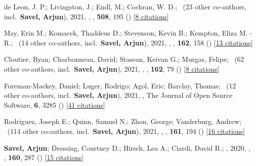 \item[{\color{numcolor}\scriptsize7}] de Leon, J. P.; Livingston, J.; Endl, M.; Cochran, W. D.; \etal\ ({23} other co-authors, incl.\ \textbf{Savel, Arjun}), 2021, , \mnras, \textbf{508}, 195 () [\href{https://ui.adsabs.harvard.edu/abs/2021MNRAS.508..195D}{8 citations}]

\item[{\color{numcolor}\scriptsize6}] May, Erin M.; Komacek, Thaddeus D.; Stevenson, Kevin B.; Kempton, Eliza M. -R.; \etal\ ({14} other co-authors, incl.\ \textbf{Savel, Arjun}), 2021, , \aj, \textbf{162}, 158 () [\href{https://ui.adsabs.harvard.edu/abs/2021AJ....162..158M}{13 citations}]

\item[{\color{numcolor}\scriptsize5}] Cloutier, Ryan; Charbonneau, David; Stassun, Keivan G.; Murgas, Felipe; \etal\ ({62} other co-authors, incl.\ \textbf{Savel, Arjun}), 2021, , \aj, \textbf{162}, 79 () [\href{https://ui.adsabs.harvard.edu/abs/2021AJ....162...79C}{8 citations}]

\item[{\color{numcolor}\scriptsize4}] Foreman-Mackey, Daniel; Luger, Rodrigo; Agol, Eric; Barclay, Thomas; \etal\ ({12} other co-authors, incl.\ \textbf{Savel, Arjun}), 2021, , The Journal of Open Source Software, \textbf{6}, 3285 () [\href{https://ui.adsabs.harvard.edu/abs/2021JOSS....6.3285F}{41 citations}]

\item[{\color{numcolor}\scriptsize3}] Rodriguez, Joseph E.; Quinn, Samuel N.; Zhou, George; Vanderburg, Andrew; \etal\ ({114} other co-authors, incl.\ \textbf{Savel, Arjun}), 2021, , \aj, \textbf{161}, 194 () [\href{https://ui.adsabs.harvard.edu/abs/2021AJ....161..194R}{16 citations}]

\item[{\color{numcolor}\scriptsize2}] \textbf{Savel, Arjun}; Dressing, Courtney D.; Hirsch, Lea A.; Ciardi, David R.; \etal, 2020, , \aj, \textbf{160}, 287 () [\href{https://ui.adsabs.harvard.edu/abs/2020AJ....160..287S}{15 citations}]

